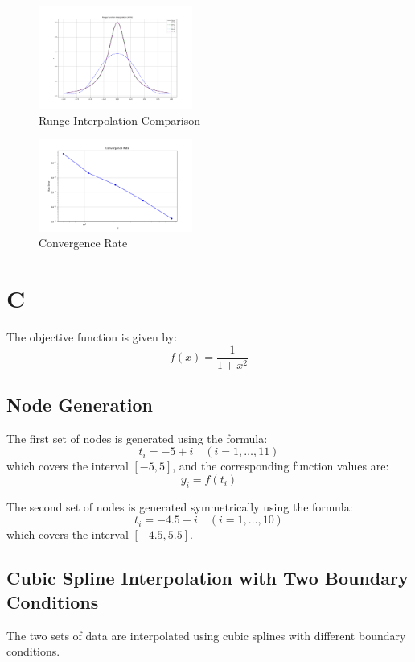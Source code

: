 \documentclass[a4paper]{article}
\begin{document}
\begin{figure}[H]
    \centering
    \includegraphics[width=0.45\textwidth]{figure/runge_interpolation_comparison.png}
    \caption{Runge Interpolation Comparison}
    \label{fig:runge_comparison}
\end{figure}

\begin{figure}[H]
    \centering
    \includegraphics[width=0.45\textwidth]{figure/convergence_rate.png}
    \caption{Convergence Rate}
    \label{fig:convergence_rate}
\end{figure}

\section*{C}
The objective function is given by:
\[
f(x) = \frac{1}{1 + x^2}
\]

\subsection*{Node Generation}
The first set of nodes is generated using the formula:
\[
t_i = -5 + i \quad (i = 1, \dots, 11)
\]
which covers the interval \([-5, 5]\), and the corresponding function values are:
\[
y_i = f(t_i)
\]

The second set of nodes is generated symmetrically using the formula:
\[
t_i = -4.5 + i \quad (i = 1, \dots, 10)
\]
which covers the interval \([-4.5, 5.5]\).

\subsection*{Cubic Spline Interpolation with Two Boundary Conditions}
The two sets of data are interpolated using cubic splines with different boundary conditions.
\end{document}
